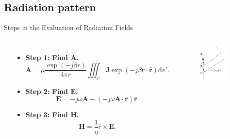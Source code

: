 \subsection{Radiation pattern}

\begin{frame}{Steps in the Evaluation of Radiation Fields}
\begin{columns}
    \cite{Stutzman_1998}
    \vspace{3mm}
    \begin{itemize}
        \item \textbf{Step 1: Find \(\mathbf{A}\).} 
        \begin{equation*}
            \mathbf{A} = \mu \dfrac{ \exp( - j \beta r ) }{ 4 \pi r } \iiint_{v'} \mathbf{J} \exp( - j \beta \mathbf{r} \cdot \mathbf{\hat{r}} )\mathrm{d} v'.
        \end{equation*}
        \item \textbf{Step 2: Find \(\mathbf{E}\).} 
        \begin{equation*}
            \mathbf{E} = -j\omega \mathbf{A} - ( -j\omega \mathbf{A} \cdot \mathbf{\hat{r}} ) \mathbf{\hat{r}}.
        \end{equation*}
        \item \textbf{Step 3: Find \(\mathbf{H}\).} 
        \begin{equation*}
            \mathbf{H} = \dfrac{1}{\eta} \hat{r} \times \mathbf{E}.
        \end{equation*}
    \end{itemize}
    \begin{figure}
        \centering
        \includegraphics[width=0.9\textwidth]{Figures/Interference.pdf}

\end{figure}
\end{columns}
\end{frame}
